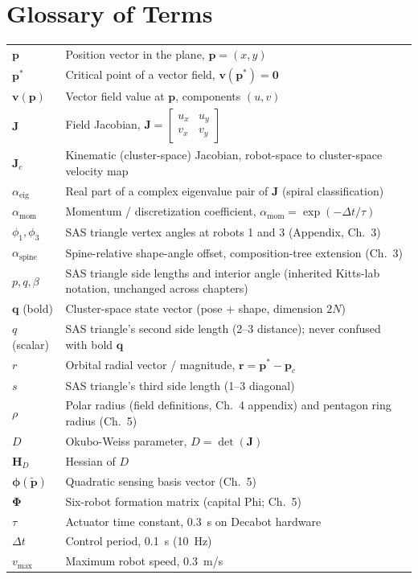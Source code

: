 \documentclass[12pt, letterpaper, oneside]{report}
\begin{document}
\chapter*{Glossary of Terms}

\begin{table}[h]
\centering
\begin{tabular}{l p{3.5in}}
$\mathbf{p}$ & Position vector in the plane, $\mathbf{p}=(x,y)$ \\
$\mathbf{p}^*$ & Critical point of a vector field, $\mathbf{v}(\mathbf{p}^*)=\mathbf{0}$ \\
$\mathbf{v}(\mathbf{p})$ & Vector field value at $\mathbf{p}$, components $(u,v)$ \\
$\mathbf{J}$ & Field Jacobian, $\mathbf{J} = \left[\begin{smallmatrix} u_x & u_y \\ v_x & v_y \end{smallmatrix}\right]$ \\
$\mathbf{J}_c$ & Kinematic (cluster-space) Jacobian, robot-space to cluster-space velocity map \\
$\alpha_{\text{eig}}$ & Real part of a complex eigenvalue pair of $\mathbf{J}$ (spiral classification) \\
$\alpha_{\text{mom}}$ & Momentum / discretization coefficient, $\alpha_{\text{mom}} = \exp(-\Delta t/\tau)$ \\
$\phi_1, \phi_3$ & SAS triangle vertex angles at robots 1 and 3 (Appendix, Ch.~3) \\
$\alpha_{\text{spine}}$ & Spine-relative shape-angle offset, composition-tree extension (Ch.~3) \\
$p, q, \beta$ & SAS triangle side lengths and interior angle (inherited Kitts-lab notation, unchanged across chapters) \\
$\mathbf{q}$ (bold) & Cluster-space state vector (pose + shape, dimension $2N$) \\
$q$ (scalar) & SAS triangle's second side length (2--3 distance); never confused with bold $\mathbf{q}$ \\
$r$ & Orbital radial vector / magnitude, $\mathbf{r} = \mathbf{p}^*-\mathbf{p}_c$ \\
$s$ & SAS triangle's third side length (1--3 diagonal) \\
$\rho$ & Polar radius (field definitions, Ch.~4 appendix) and pentagon ring radius (Ch.~5) \\
$D$ & Okubo-Weiss parameter, $D = \det(\mathbf{J})$ \\
$\mathbf{H}_D$ & Hessian of $D$ \\
$\boldsymbol{\phi}(\tilde{\mathbf{p}})$ & Quadratic sensing basis vector (Ch.~5) \\
$\boldsymbol{\Phi}$ & Six-robot formation matrix (capital Phi; Ch.~5) \\
$\tau$ & Actuator time constant, 0.3~s on Decabot hardware \\
$\Delta t$ & Control period, 0.1~s (10~Hz) \\
$v_{\max}$ & Maximum robot speed, 0.3~m/s \\
\end{tabular}
\end{table}
\end{document}
